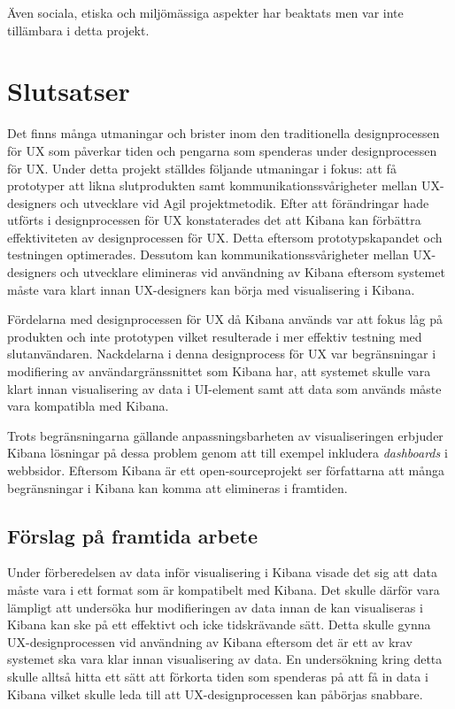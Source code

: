 \documentclass[12pt]{kththesis}
\begin{document}
Även sociala, etiska och miljömässiga aspekter har beaktats men var inte tillämbara i detta projekt.

\chapter{Slutsatser}
Det finns många utmaningar och brister inom den traditionella designprocessen för UX som påverkar tiden och pengarna som spenderas under designprocessen för UX. Under detta projekt ställdes följande utmaningar i fokus: att få prototyper att likna slutprodukten samt kommunikationssvårigheter mellan UX-designers och utvecklare vid Agil projektmetodik. Efter att förändringar hade utförts i designprocessen för UX konstaterades det att Kibana kan förbättra effektiviteten av designprocessen för UX. Detta eftersom prototypskapandet och testningen optimerades. Dessutom  kan kommunikationssvårigheter mellan UX-designers och utvecklare elimineras vid användning av Kibana eftersom systemet måste vara klart innan UX-designers kan börja med visualisering i Kibana. 

Fördelarna med designprocessen för UX då Kibana används var att fokus låg på produkten och inte prototypen vilket resulterade i mer effektiv testning med slutanvändaren. Nackdelarna i denna designprocess för UX var begränsningar i modifiering av användargränssnittet som Kibana har, att systemet skulle vara klart innan visualisering av data i UI-element samt att data som används måste vara kompatibla med Kibana.  

Trots begränsningarna gällande anpassningsbarheten av visualiseringen erbjuder Kibana lösningar på dessa problem genom att till exempel inkludera \textit{dashboards} i webbsidor.  Eftersom Kibana är ett open-sourceprojekt ser författarna att många begränsningar i Kibana kan komma att elimineras i framtiden. 

\section{Förslag på framtida arbete}
Under förberedelsen av data inför visualisering i Kibana visade det sig att data måste vara i ett format som är kompatibelt med Kibana. Det skulle därför vara lämpligt att undersöka hur modifieringen av data innan de kan visualiseras i Kibana kan ske på ett effektivt och icke tidskrävande sätt. Detta skulle gynna UX-designprocessen vid användning av Kibana eftersom det är ett av krav systemet ska vara klar innan visualisering av data. En undersökning kring detta skulle alltså hitta ett sätt att förkorta tiden som spenderas på att få in data i Kibana vilket skulle leda till att UX-designprocessen kan påbörjas snabbare.
\end{document}
